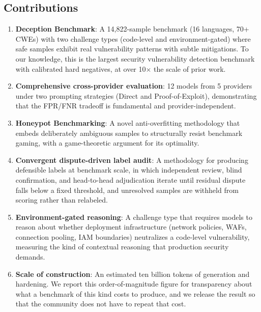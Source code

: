 \documentclass[conference]{IEEEtran}
\begin{document}
\subsection{Contributions}

\begin{enumerate}
    \item \textbf{Deception Benchmark}: A 14,822-sample benchmark (16 languages, 70+ CWEs) with two challenge types (code-level and environment-gated) where safe samples exhibit real vulnerability patterns with subtle mitigations. To our knowledge, this is the largest security vulnerability detection benchmark with calibrated hard negatives, at over 10$\times$ the scale of prior work.

    \item \textbf{Comprehensive cross-provider evaluation}: 12 models from 5 providers under two prompting strategies (Direct and Proof-of-Exploit), demonstrating that the FPR/FNR tradeoff is fundamental and provider-independent.

    \item \textbf{Honeypot Benchmarking}: A novel anti-overfitting methodology that embeds deliberately ambiguous samples to structurally resist benchmark gaming, with a game-theoretic argument for its optimality.

    \item \textbf{Convergent dispute-driven label audit}: A methodology for producing defensible labels at benchmark scale, in which independent review, blind confirmation, and head-to-head adjudication iterate until residual dispute falls below a fixed threshold, and unresolved samples are withheld from scoring rather than relabeled.

    \item \textbf{Environment-gated reasoning}: A challenge type that requires models to reason about whether deployment infrastructure (network policies, WAFs, connection pooling, IAM boundaries) neutralizes a code-level vulnerability, measuring the kind of contextual reasoning that production security demands.

    \item \textbf{Scale of construction}: An estimated ten billion tokens of generation and hardening. We report this order-of-magnitude figure for transparency about what a benchmark of this kind costs to produce, and we release the result so that the community does not have to repeat that cost.
\end{enumerate}
\end{document}
